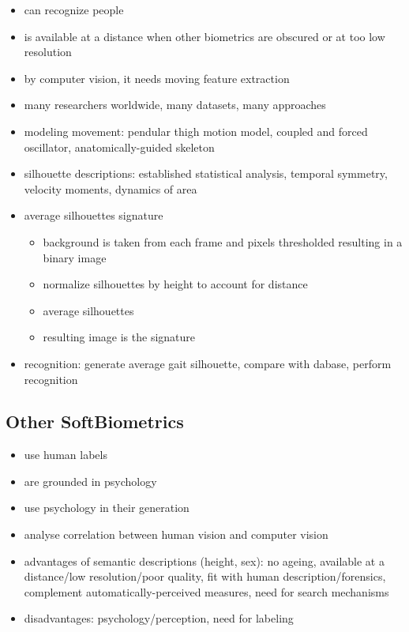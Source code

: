 \documentclass[paper=a4, fontsize=11pt]{scrartcl} %
\numberwithin{equation}{section} %
\numberwithin{figure}{section} %
\numberwithin{table}{section} %
\begin{document}
\begin{itemize}
\item can recognize people
\item is available at a distance when other biometrics are obscured or at too low resolution
\item by computer vision, it needs moving feature extraction
\item many researchers worldwide, many datasets, many approaches
\item modeling movement: pendular thigh motion model, coupled and forced oscillator, anatomically-guided skeleton
\item silhouette descriptions: established statistical analysis, temporal symmetry, velocity moments, dynamics of area
\item average silhouettes signature
\begin{itemize}
\item background is taken from each frame and pixels thresholded resulting in a binary image
\item normalize silhouettes by height to account for distance
\item average silhouettes
\item resulting image is the signature
\end{itemize}
\item recognition: generate average gait silhouette, compare with dabase, perform recognition
\end{itemize}

\subsection{Other SoftBiometrics}

\begin{itemize}
\item use human labels
\item are grounded in psychology
\item use psychology in their generation
\item analyse correlation between human vision and computer vision
\item advantages of semantic descriptions (height, sex): no ageing, available at a distance/low resolution/poor quality, fit with human description/forensics, complement automatically-perceived measures, need for search mechanisms
\item disadvantages: psychology/perception, need for labeling 
\end{itemize}
\end{document}
